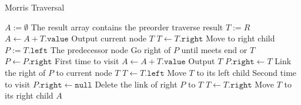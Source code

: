\begin{algorithm}[H]
\caption{Morris Traversal}
\begin{algorithmic}[1]
\State $A:=\emptyset$ \Comment The result array contains the preorder traverse result
\State $T:=R$
\State $A\gets A+T.\texttt{value}$ \Comment Output current node $T$
\State $T\gets T.\texttt{right}$ \Comment Move to right child
\Else
\State $P:=T.\texttt{left}$ \Comment The predecessor node
 \Comment Go right of $P$ until meets end or $T$
\State $P\gets P.\texttt{right}$
\EndWhile
{} \Comment First time to visit
\State $A\gets A + T.\texttt{value}$ \Comment Output $T$
\State $P.\texttt{right}\gets T$ \Comment Link the right of $P$ to current node $T$
\State $T\gets T.\texttt{left}$ \Comment Move $T$ to its left child
\Else \Comment Second time to visit
\State $P.\texttt{right}\gets \texttt{null}$ \Comment Delete the link of right $P$ to $T$
\State $T\gets T.\texttt{right}$ \Comment Move $T$ to its right child
\EndIf
\EndIf
\EndWhile
\State \Return $A$
\EndProcedure
\end{algorithmic}
\end{algorithm}
